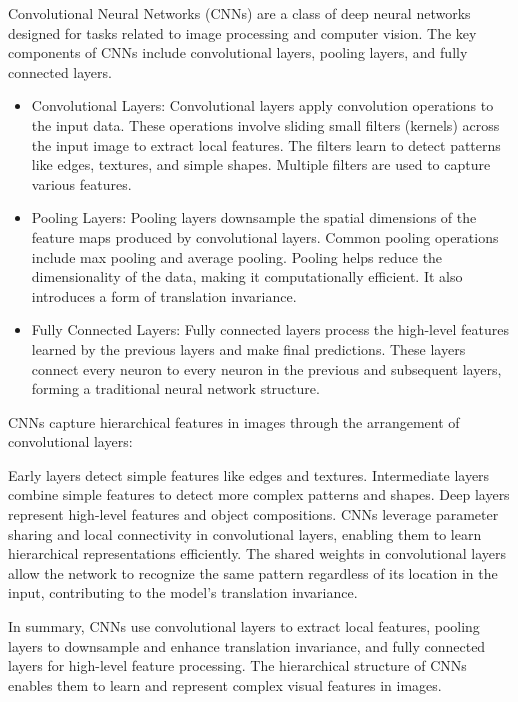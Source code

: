 \documentclass[a4paper,11pt,addpoints]{exam}
\begin{document}
\begin{questions}
    \begin{solution}[5in]
        Convolutional Neural Networks (CNNs) are a class of deep neural networks designed for tasks related to image processing and computer vision. The key components of CNNs include convolutional layers, pooling layers, and fully connected layers.
        \begin{itemize}
        \item Convolutional Layers:
        Convolutional layers apply convolution operations to the input data. These operations involve sliding small filters (kernels) across the input image to extract local features.
        The filters learn to detect patterns like edges, textures, and simple shapes. Multiple filters are used to capture various features.

        \item Pooling Layers:
        Pooling layers downsample the spatial dimensions of the feature maps produced by convolutional layers. Common pooling operations include max pooling and average pooling.
        Pooling helps reduce the dimensionality of the data, making it computationally efficient. It also introduces a form of translation invariance.
        \item Fully Connected Layers:
        Fully connected layers process the high-level features learned by the previous layers and make final predictions.
        These layers connect every neuron to every neuron in the previous and subsequent layers, forming a traditional neural network structure.
        \end{itemize}
        CNNs capture hierarchical features in images through the arrangement of convolutional layers:
        
        Early layers detect simple features like edges and textures.
        Intermediate layers combine simple features to detect more complex patterns and shapes.
        Deep layers represent high-level features and object compositions.
        CNNs leverage parameter sharing and local connectivity in convolutional layers, enabling them to learn hierarchical representations efficiently. The shared weights in convolutional layers allow the network to recognize the same pattern regardless of its location in the input, contributing to the model's translation invariance.
        
        In summary, CNNs use convolutional layers to extract local features, pooling layers to downsample and enhance translation invariance, and fully connected layers for high-level feature processing. The hierarchical structure of CNNs enables them to learn and represent complex visual features in images.
    \end{solution}



\end{questions}
\end{document}
